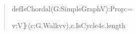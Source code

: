 \documentclass[spanish,11pt,a4paper]{article}
\newlength{\LeanCharWidth}
\begin{document}
\begin{quote}\fontsize{8.5}{10.2}\selectfont\ttfamily\raggedright\setlength{\parskip}{0pt}\settowidth{\LeanCharWidth}{0}
\noindent def\hspace*{\dimexpr 1\LeanCharWidth\relax}IsChordal\hspace*{\dimexpr 1\LeanCharWidth\relax}(G\hspace*{\dimexpr 1\LeanCharWidth\relax}:\hspace*{\dimexpr 1\LeanCharWidth\relax}SimpleGraph\hspace*{\dimexpr 1\LeanCharWidth\relax}V)\hspace*{\dimexpr 1\LeanCharWidth\relax}:\hspace*{\dimexpr 1\LeanCharWidth\relax}Prop\hspace*{\dimexpr 1\LeanCharWidth\relax}:=\par
\noindent \hspace*{\dimexpr 2\LeanCharWidth\relax}{\LeanSymbols ∀}\hspace*{\dimexpr 1\LeanCharWidth\relax}{\LeanSymbols ⦃}v\hspace*{\dimexpr 1\LeanCharWidth\relax}:\hspace*{\dimexpr 1\LeanCharWidth\relax}V{\LeanSymbols ⦄}\hspace*{\dimexpr 1\LeanCharWidth\relax}(c\hspace*{\dimexpr 1\LeanCharWidth\relax}:\hspace*{\dimexpr 1\LeanCharWidth\relax}G.Walk\hspace*{\dimexpr 1\LeanCharWidth\relax}v\hspace*{\dimexpr 1\LeanCharWidth\relax}v),\hspace*{\dimexpr 1\LeanCharWidth\relax}c.IsCycle\hspace*{\dimexpr 1\LeanCharWidth\relax}{\LeanSymbols →}\hspace*{\dimexpr 1\LeanCharWidth\relax}4\hspace*{\dimexpr 1\LeanCharWidth\relax}{\LeanSymbols ≤}\hspace*{\dimexpr 1\LeanCharWidth\relax}c.length\hspace*{\dimexpr 1\LeanCharWidth\relax}{\LeanSymbols →}\par

\end{quote}
\end{document}
